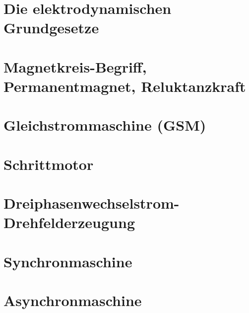 \documentclass[10pt,twoside,a4paper,fleqn]{article}
\begin{document}
\setcounter{tocdepth}{2} 	%
\tableofcontents 				%
\newpage
\section{Die elektrodynamischen Grundgesetze}

\section{Magnetkreis-Begriff, Permanentmagnet, Reluktanzkraft}

\section{Gleichstrommaschine (GSM)}

\section{Schrittmotor}

\section{Dreiphasenwechselstrom-Drehfelderzeugung}

\section{Synchronmaschine}

\section{Asynchronmaschine}

\end{document}
